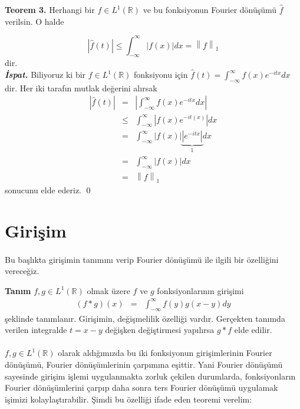 \documentclass[a4paper, 10pt]{article}
\begin{document}
\textbf{Teorem 3.} Herhangi bir $f\in L^1(\mathbb{R})$ ve bu fonksiyonun Fourier dönüşümü $\widehat{f}$ verilsin. O halde

$$ \left| \widehat{f}(t) \right| \leq \int_{-\infty}^{\infty} \left| f(x) \right| dx = \left \| f \right \|_{1}  $$
dir. \\
\textit{\textbf{İspat.}} Biliyoruz ki bir $f \in L^1(\mathbb{R})$ fonksiyonu için $\widehat{f}(t) =  \int_{-\infty }^{\infty } f(x) e^{-itx}dx$ dir. Her iki tarafın mutlak değerini alırsak
	\begin{eqnarray*} 
		\left| \widehat{f}(t) \right| &=& \left| \int_{-\infty }^{\infty } f(x) e^{-itx}dx \right| \\
		&\leq &  \int_{-\infty }^{ \infty } \left| f(x)e^{-it(x)} \right| dx \\   
		&=& \int_{- \infty}^{\infty} \left| f(x) \right| \underbrace{\left| e^{-itx} \right| }_{1} dx \\
		&=& \int_{- \infty}^{\infty} \left| f(x) \right| dx \\
		&=& \left \| f \right \|_{1}
	\end{eqnarray*}
sonucunu elde ederiz. \qed

\section{Girişim}
\paragraph{}
Bu başlıkta girişimin tanımını verip Fourier dönüşümü ile ilgili bir özelliğini vereceğiz.

\textbf{Tanım} $f,g \in L^1(\mathbb{R})$ olmak üzere $f$ ve $g$ fonksiyonlarının girişimi
\begin{eqnarray*} 
 \left( f\ast g \right) (x) &=& \int_{- \infty}^{\infty} f(y) g(x-y) dy
\end{eqnarray*}
şeklinde tanımlanır. Girişimin, değişmelilik özelliği vardır. Gerçekten tanımda verilen integralde $t=x-y$ değişken değiştirmesi yapılırsa $g\ast f$ elde edilir.
\paragraph{}
$f,g \in L^1(\mathbb{R})$ olarak aldığımızda bu iki fonksiyonun girişimlerinin Fourier dönüşümü, Fourier dönüşümlerinin çarpımına eşittir. Yani Fourier dönüşümü sayesinde girişim işlemi uygulanmakta zorluk çekilen durumlarda, fonksiyonların Fourier dönüşümlerini çarpıp daha sonra ters Fourier dönüşümü uygulamak işimizi kolaylaştırabilir. Şimdi bu özelliği ifade eden teoremi verelim:
\end{document}
